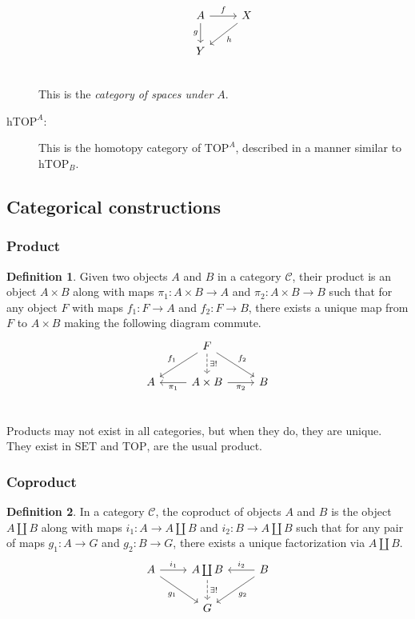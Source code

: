 \documentclass[12pt, notitlepage]{article}
\theoremstyle{definition}
\newtheorem{defn}{Definition}[section]
\newcommand{\cat}[1]{\mathrm{#1}}
\begin{document}
\begin{description}
    \[
    \begin{tikzcd}
    A \arrow{r}{f} \arrow[swap]{d}{g} & X \ar{dl}{h}  \\
    Y & \\
    \end{tikzcd}
    \]
    This is the \emph{category of spaces under $A$}.
    \item[$\cat{hTOP}^A$:] This is the homotopy category of $\cat{TOP}^A$, described in a manner similar to $\cat{hTOP}_B$.
\end{description}

\subsection{Categorical constructions}
\subsubsection{Product}

\begin{defn}
Given two objects $A$ and $B$ in a category $\mathcal{C}$, their product is an object $A \times B$ along with maps $\pi_1 : A \times B \to A$ and $\pi_2 : A \times B \to B$ such that for any object $F$ with maps $f_1 : F \to A$ and $f_2: F \to B$, there exists a unique map from $F$ to $A \times B$ making the following diagram commute.
\[
\begin{tikzcd}
&      F \arrow[swap]{dl}{f_1} \arrow{dr}{f_2} \arrow[dashed]{d}{\exists !}     & \\
A & A \times B \arrow{l}{\pi_1} \arrow[swap]{r}{\pi_2}  & B \\
\end{tikzcd}
\]    
\end{defn}

Products may not exist in all categories, but when they do, they are unique. They exist in $\cat{SET}$ and $\cat{TOP}$, are the usual product.

\subsubsection{Coproduct}

\begin{defn}
    In a category $\mathcal{C}$, the coproduct of objects $A$ and $B$ is the object $A \coprod B$ along with maps $i_1: A \to A \coprod B$ and $i_2: B \to A \coprod B$ such that for any pair of maps $g_1 : A \to G$ and $g_2: B \to G$, there exists a unique factorization via $A \coprod B$.
    \[
    \begin{tikzcd}
    A \ar{r}{i_1} \ar[swap]{dr}{g_1} & A \coprod B \ar[dashed]{d}{\exists !} & B \ar[swap]{l}{i_2} \ar{dl}{g_2} \\
    & G & \\
    \end{tikzcd}
    \]
    
\end{defn}
\end{document}
